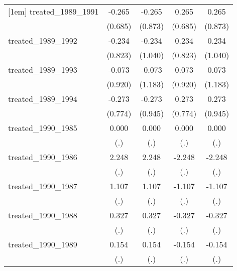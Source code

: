 {\begin{tabular}{l*{4}{c}}
[1em]
treated\_1989\_1991&      -0.265         &      -0.265         &       0.265         &       0.265         \\
            &     (0.685)         &     (0.873)         &     (0.685)         &     (0.873)         \\
[1em]
treated\_1989\_1992&      -0.234         &      -0.234         &       0.234         &       0.234         \\
            &     (0.823)         &     (1.040)         &     (0.823)         &     (1.040)         \\
[1em]
treated\_1989\_1993&      -0.073         &      -0.073         &       0.073         &       0.073         \\
            &     (0.920)         &     (1.183)         &     (0.920)         &     (1.183)         \\
[1em]
treated\_1989\_1994&      -0.273         &      -0.273         &       0.273         &       0.273         \\
            &     (0.774)         &     (0.945)         &     (0.774)         &     (0.945)         \\
[1em]
treated\_1990\_1985&       0.000         &       0.000         &       0.000         &       0.000         \\
            &         (.)         &         (.)         &         (.)         &         (.)         \\
[1em]
treated\_1990\_1986&       2.248         &       2.248         &      -2.248         &      -2.248         \\
            &         (.)         &         (.)         &         (.)         &         (.)         \\
[1em]
treated\_1990\_1987&       1.107         &       1.107         &      -1.107         &      -1.107         \\
            &         (.)         &         (.)         &         (.)         &         (.)         \\
[1em]
treated\_1990\_1988&       0.327         &       0.327         &      -0.327         &      -0.327         \\
            &         (.)         &         (.)         &         (.)         &         (.)         \\
[1em]
treated\_1990\_1989&       0.154         &       0.154         &      -0.154         &      -0.154         \\
            &         (.)         &         (.)         &         (.)         &         (.)         \\

\end{tabular}}
